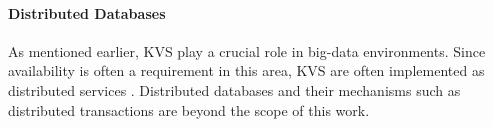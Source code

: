 \paragraph{Distributed Databases}

As mentioned earlier, \ac{KVS} play a crucial role in big-data environments.
Since availability is often a requirement in this area, \ac{KVS} are often
implemented as distributed services \cite{decandia2007dynamo,
lakshman2010cassandra, wang2015hydradb}. Distributed databases and their
mechanisms such as distributed transactions are beyond the scope of this work.
